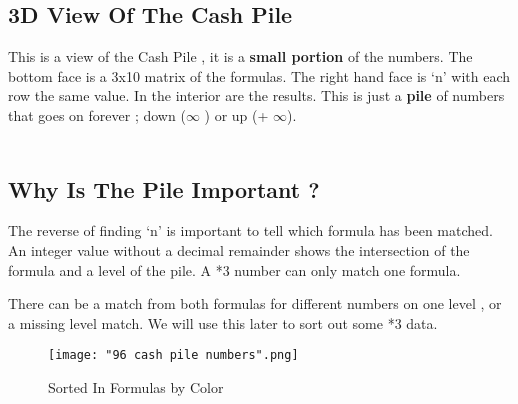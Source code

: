 \documentclass[12pt,letterpaper,oneside,titlepage]{article}
\makeatletter
\newcommand{\tikzcuboid@shiftx}{0}
\newcommand{\tikzcuboid@shifty}{0}
\newcommand{\tikzcuboid@dimx}{3}
\newcommand{\tikzcuboid@dimy}{3}
\newcommand{\tikzcuboid@dimz}{3}
\newcommand{\tikzcuboid@scale}{1}
\newcommand{\tikzcuboid@densityx}{1}
\newcommand{\tikzcuboid@densityy}{1}
\newcommand{\tikzcuboid@densityz}{1}
\newcommand{\tikzcuboid@rotation}{0}
\newcommand{\tikzcuboid@anglex}{0}
\newcommand{\tikzcuboid@angley}{90}
\newcommand{\tikzcuboid@anglez}{225}
\newcommand{\tikzcuboid@scalex}{1}
\newcommand{\tikzcuboid@scaley}{1}
\newcommand{\tikzcuboid@scalez}{sqrt(0.5)}
\newcommand{\tikzcuboid@linefront}{black}
\newcommand{\tikzcuboid@linetop}{black}
\newcommand{\tikzcuboid@lineright}{black}
\newcommand{\tikzcuboid@fillfront}{white}
\newcommand{\tikzcuboid@filltop}{white}
\newcommand{\tikzcuboid@fillright}{white}
\newcommand{\tikzcuboid@emphedge}{N}
\newcommand{\tikzcuboid@emphstyle}{thick}
\newcommand{\tikzcuboid}[1]{
	\setkeys{tikzcuboid}{#1} %
	\pgfmathsetmacro{\vectorxx}{\tikzcuboid@scalex*cos(\tikzcuboid@anglex)}
	\pgfmathsetmacro{\vectorxy}{\tikzcuboid@scalex*sin(\tikzcuboid@anglex)}
	\pgfmathsetmacro{\vectoryx}{\tikzcuboid@scaley*cos(\tikzcuboid@angley)}
	\pgfmathsetmacro{\vectoryy}{\tikzcuboid@scaley*sin(\tikzcuboid@angley)}
	\pgfmathsetmacro{\vectorzx}{\tikzcuboid@scalez*cos(\tikzcuboid@anglez)}
	\pgfmathsetmacro{\vectorzy}{\tikzcuboid@scalez*sin(\tikzcuboid@anglez)}
	\begin{scope}[xshift=\tikzcuboid@shiftx, yshift=\tikzcuboid@shifty, scale=\tikzcuboid@scale, rotate=\tikzcuboid@rotation, x={(\vectorxx,\vectorxy)}, y={(\vectoryx,\vectoryy)}, z={(\vectorzx,\vectorzy)}]
		\pgfmathsetmacro{\steppingx}{1/\tikzcuboid@densityx}
		\pgfmathsetmacro{\steppingy}{1/\tikzcuboid@densityy}
		\pgfmathsetmacro{\steppingz}{1/\tikzcuboid@densityz}
		\newcommand{\dimx}{\tikzcuboid@dimx}
		\newcommand{\dimy}{\tikzcuboid@dimy}
		\newcommand{\dimz}{\tikzcuboid@dimz}
		\pgfmathsetmacro{\secondx}{2*\steppingx}
		\pgfmathsetmacro{\secondy}{2*\steppingy}
		\pgfmathsetmacro{\secondz}{2*\steppingz}
		\foreach \x in {\steppingx,\secondx,...,\dimx}
		{   \foreach \y in {\steppingy,\secondy,...,\dimy}
			{   \pgfmathsetmacro{\lowx}{(\x-\steppingx)}
				\pgfmathsetmacro{\lowy}{(\y-\steppingy)}
				\filldraw[fill=\tikzcuboid@fillfront,draw=\tikzcuboid@linefront] (\lowx,\lowy,\dimz) -- (\lowx,\y,\dimz) -- (\x,\y,\dimz) -- (\x,\lowy,\dimz) -- cycle;
				
			}
		}
		\foreach \x in {\steppingx,\secondx,...,\dimx}
		{   \foreach \z in {\steppingz,\secondz,...,\dimz}
			{   \pgfmathsetmacro{\lowx}{(\x-\steppingx)}
				\pgfmathsetmacro{\lowz}{(\z-\steppingz)}
				\filldraw[fill=\tikzcuboid@filltop,draw=\tikzcuboid@linetop] (\lowx,\dimy,\lowz) -- (\lowx,\dimy,\z) -- (\x,\dimy,\z) -- (\x,\dimy,\lowz) -- cycle;
			}
		}
		\foreach \y in {\steppingy,\secondy,...,\dimy}
		{   \foreach \z in {\steppingz,\secondz,...,\dimz}
			{   \pgfmathsetmacro{\lowy}{(\y-\steppingy)}
				\pgfmathsetmacro{\lowz}{(\z-\steppingz)}
				\filldraw[fill=\tikzcuboid@fillright,draw=\tikzcuboid@lineright] (\dimx,\lowy,\lowz) -- (\dimx,\lowy,\z) -- (\dimx,\y,\z) -- (\dimx,\y,\lowz) -- cycle;
			}
		}
		\ifthenelse{\equal{\tikzcuboid@emphedge}{Y}}%
		{\draw[\tikzcuboid@emphstyle](0,\dimy,0) -- (\dimx,\dimy,0) -- (\dimx,\dimy,\dimz) -- (0,\dimy,\dimz) -- cycle;%
			\draw[\tikzcuboid@emphstyle] (0,0,\dimz) -- (0,\dimy,\dimz) -- (\dimx,\dimy,\dimz) -- (\dimx,0,\dimz) -- cycle;%
			\draw[\tikzcuboid@emphstyle](\dimx,0,0) -- (\dimx,\dimy,0) -- (\dimx,\dimy,\dimz) -- (\dimx,0,\dimz) -- cycle;%
		}%
		{}
	\end{scope}
}
\makeatother
\begin{document}
\subsection{3D View Of The Cash Pile}
\par 
This is a view of the Cash Pile , it is a \textbf{small portion} of the numbers. The bottom face is a 3x10 matrix of the formulas. The right hand face is  `n' with each row the same value. In the interior are the results. This is just a \textbf{pile} of numbers that goes on forever  ; down (\textendash $\infty$ ) or up (+ $\infty$).
\\
\\

\pagebreak
\subsection{Why Is The Pile Important ?}
\par 
\hspace*{6mm} The reverse of finding `n' is important to tell which formula has been matched. An integer value without a decimal remainder shows the intersection of the formula and a level of the pile. A *3 number can only match one formula.
\\
\par 
There can be a match from both formulas for different numbers on one level , or a missing level match. We will use this later to sort out some *3 data.

\begin{figure}[h]
	\centering
	\texttt{[image: "96 cash pile numbers".png]}
	\caption{Sorted In Formulas by Color}
\end{figure}
\pagebreak







\end{document}
